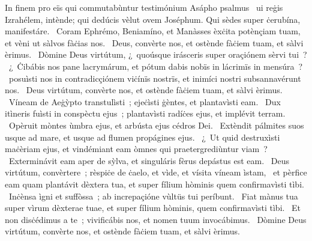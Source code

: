 { In finem pro eïs qui commutabùntur testimónium Asápho psalmus}
{%
~ui reġis Izrahélem, intènde; qui dedúcis vèlut ovem Joséphum. Qui sèdes super ċerubína, manifestáre. 
~Coram Ephrémo, Beniamíno, et Manàsses èxċita potènçiam tuam, et vèni ut sàlvos fàċias nos. 
~Deus, convèrte nos, et ostènde fàċiem tuam, et sàlvi èrimus. 
~Dòmine Deus virtútum, ¿~quoúsque irásceris super oraçiónem sèrvi tui~? 
~¿~Ċibábis nos pane lacrymárum, et pótum dabis nobïs in lácrimïs in mensúra~? 
~posuìsti nos in contradicçiónem viċínïs nostrïs, et inimíci nostri subsannavérunt nos. 
~Deus virtútum, convèrte nos, et ostènde fàċiem tuam, et sàlvi èrimus. 
~Víneam de Aeġỳpto transtulìsti~; ejeċìsti ġèntes, et plantavìsti eam. 
~Dux itìneris fuìsti in conspèctu ejus~; plantavìsti radíċes ejus, et implévit terram. 
~Opèruit mòntes ùmbra ejus, et arbústa ejus cédros Dei. 
~Extèndit pálmites suos usque ad mare, et usque ad flumen propágines ejus. 
~¿~Ut quid destruxìsti maċèriam ejus, et vindémiant eam òmnes qui praetergrediùntur viam~? 
~Exterminávit eam aper de sỳlva, et singuláris fèrus depástus est eam. 
~Deus virtútum, convèrtere~; rèspiċe de ċaelo, et vìde, et vísita víneam ìstam, 
~et pèrfice eam quam plantávit dèxtera tua, et super fílium hòminis quem confirmavìsti tìbi. 
~Inċènsa ìgni et suffòssa~; ab increpaçióne vùltüs tui períbunt. 
~Fiat mànus tua super vìrum dèxterae tuae, et super fílium hòminis, quem confirmavìsti tìbi. 
~Et non disċédimus a te~; vivificábis nos, et nomen tuum invocábimus. 
~Dòmine Deus virtútum, convèrte nos, et ostènde fàċiem tuam, et sàlvi èrimus. 
}
